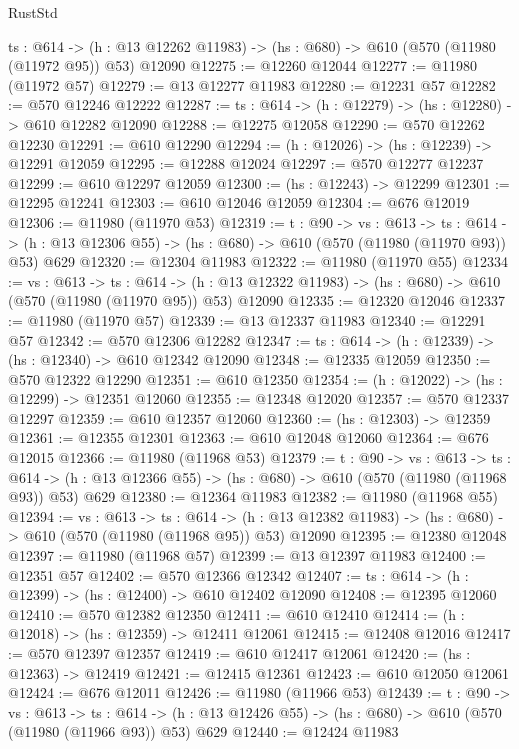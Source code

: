 \begin{lexlean}{RustStd}
\begin{coremodule}
  {ts : @614} ->
  (h : @13 @12262 @11983) -> (hs : @680) -> @610 (@570 (@11980 (@11972 @95)) @53) @12090
@12275 := @12260 @12044
@12277 := @11980 (@11972 @57)
@12279 := @13 @12277 @11983
@12280 := @12231 @57
@12282 := @570 @12246 @12222
@12287 := {ts : @614} -> (h : @12279) -> (hs : @12280) -> @610 @12282 @12090
@12288 := @12275 @12058
@12290 := @570 @12262 @12230
@12291 := @610 @12290
@12294 := (h : @12026) -> (hs : @12239) -> @12291 @12059
@12295 := @12288 @12024
@12297 := @570 @12277 @12237
@12299 := @610 @12297 @12059
@12300 := (hs : @12243) -> @12299
@12301 := @12295 @12241
@12303 := @610 @12046 @12059
@12304 := @676 @12019
@12306 := @11980 (@11970 @53)
@12319 := {t : @90} ->
  {vs : @613} ->
  {ts : @614} -> (h : @13 @12306 @55) -> (hs : @680) -> @610 (@570 (@11980 (@11970 @93)) @53) @629
@12320 := @12304 @11983
@12322 := @11980 (@11970 @55)
@12334 := {vs : @613} ->
  {ts : @614} ->
  (h : @13 @12322 @11983) -> (hs : @680) -> @610 (@570 (@11980 (@11970 @95)) @53) @12090
@12335 := @12320 @12046
@12337 := @11980 (@11970 @57)
@12339 := @13 @12337 @11983
@12340 := @12291 @57
@12342 := @570 @12306 @12282
@12347 := {ts : @614} -> (h : @12339) -> (hs : @12340) -> @610 @12342 @12090
@12348 := @12335 @12059
@12350 := @570 @12322 @12290
@12351 := @610 @12350
@12354 := (h : @12022) -> (hs : @12299) -> @12351 @12060
@12355 := @12348 @12020
@12357 := @570 @12337 @12297
@12359 := @610 @12357 @12060
@12360 := (hs : @12303) -> @12359
@12361 := @12355 @12301
@12363 := @610 @12048 @12060
@12364 := @676 @12015
@12366 := @11980 (@11968 @53)
@12379 := {t : @90} ->
  {vs : @613} ->
  {ts : @614} -> (h : @13 @12366 @55) -> (hs : @680) -> @610 (@570 (@11980 (@11968 @93)) @53) @629
@12380 := @12364 @11983
@12382 := @11980 (@11968 @55)
@12394 := {vs : @613} ->
  {ts : @614} ->
  (h : @13 @12382 @11983) -> (hs : @680) -> @610 (@570 (@11980 (@11968 @95)) @53) @12090
@12395 := @12380 @12048
@12397 := @11980 (@11968 @57)
@12399 := @13 @12397 @11983
@12400 := @12351 @57
@12402 := @570 @12366 @12342
@12407 := {ts : @614} -> (h : @12399) -> (hs : @12400) -> @610 @12402 @12090
@12408 := @12395 @12060
@12410 := @570 @12382 @12350
@12411 := @610 @12410
@12414 := (h : @12018) -> (hs : @12359) -> @12411 @12061
@12415 := @12408 @12016
@12417 := @570 @12397 @12357
@12419 := @610 @12417 @12061
@12420 := (hs : @12363) -> @12419
@12421 := @12415 @12361
@12423 := @610 @12050 @12061
@12424 := @676 @12011
@12426 := @11980 (@11966 @53)
@12439 := {t : @90} ->
  {vs : @613} ->
  {ts : @614} -> (h : @13 @12426 @55) -> (hs : @680) -> @610 (@570 (@11980 (@11966 @93)) @53) @629
@12440 := @12424 @11983

\end{coremodule}
\end{lexlean}
